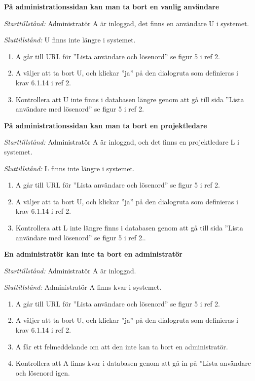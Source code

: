 \documentclass[a4paper]{article}
\begin{document}
\begin{FT}
\item %
\textbf{På administrationssidan kan man ta bort en vanlig användare}

\emph{Starttillstånd:} Administratör A är inloggad, det finns en användare U i systemet.

\emph{Sluttillstånd:} U finns inte längre i systemet.

\begin{enumerate}
\item A går till URL för ''Lista användare och lösenord'' se figur 5 i ref 2. 
\item A väljer att ta bort U, och klickar ''ja'' på den dialogruta som definieras i krav 6.1.14 i ref 2.
\item Kontrollera att U inte finns i databasen längre genom att gå till sida ''Lista användare med lösenord'' se figur 5 i ref 2.
\end{enumerate}

\item %
\textbf{På administrationssidan kan man ta bort en projektledare}

\emph{Starttillstånd:} Administratör A är inloggad, och det finns en projektledare L i systemet.

\emph{Sluttillstånd:} L finns inte längre i systemet.

\begin{enumerate}
\item A går till URL för ''Lista användare och lösenord'' se figur 5 i ref 2.
\item A väljer att ta bort U, och klickar ''ja'' på den dialogruta som definieras i krav 6.1.14 i ref 2.
\item Kontrollera att L inte längre finns i databasen genom att gå till sida ''Lista användare med lösenord'' se figur 5 i ref 2..
\end{enumerate}

\item %
\textbf{En administratör kan inte ta bort en administratör}

\emph{Starttillstånd:} Administratör A är inloggad.

\emph{Sluttillstånd:} Administratör A finns kvar i systemet.

\begin{enumerate}
\item A går till URL för ''Lista användare och lösenord'' se figur 5 i ref 2.
\item A väljer att ta bort U, och klickar ''ja'' på den dialogruta som definieras i krav 6.1.14 i ref 2.
\item A får ett felmeddelande om att den inte kan ta bort en administratör.
\item Kontrollera att A finns kvar i databasen genom att gå in på ''Lista användare och lösenord igen.
\end{enumerate}


\end{FT}
\end{document}
